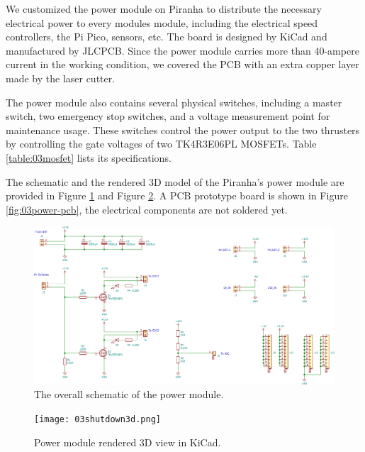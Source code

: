 We customized the power module on Piranha to distribute the necessary electrical power to every modules module, including the electrical speed controllers, the Pi Pico, sensors, etc. The board is designed by KiCad and manufactured by JLCPCB. Since the power module carries more than 40-ampere current in the working condition, we covered the PCB with an extra copper layer made by the laser cutter.

The power module also contains several physical switches, including a master switch, two emergency stop switches, and a voltage measurement point for maintenance usage. These switches control the power output to the two thrusters by controlling the gate voltages of two TK4R3E06PL MOSFETs. Table \ref{table:03mosfet} lists its specifications.

The schematic and the rendered 3D model of the Piranha's power module are provided in Figure \ref{fig:03power} and Figure \ref{fig:03shutdown3d}. A PCB prototype board is shown in Figure \ref{fig:03power-pcb}, the electrical components are not soldered yet.

\begin{figure}[H]
    \centering
    \includegraphics[width=.9\textwidth]{images/03shutdown-sch-no-title.pdf}
    \caption{The overall schematic of the power module.}
    \label{fig:03power}
\end{figure}

\begin{figure}[H]
    \centering
    \texttt{[image: 03shutdown3d.png]}
    \caption{Power module rendered 3D view in KiCad.}
    \label{fig:03shutdown3d}
\end{figure}


